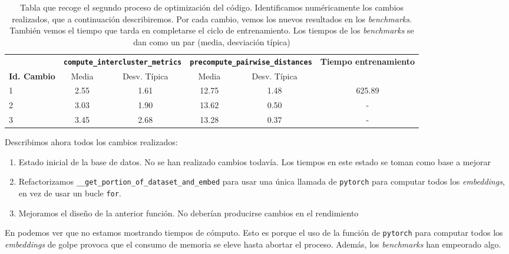 \begin{table}[H]
    \centering
    \begin{tabular}{lccccc}
        \toprule
        \textbf{} & \multicolumn{2}{c}{\textbf{\lstinline|compute_intercluster_metrics|}} & \multicolumn{2}{c}{\textbf{\lstinline|precompute_pairwise_distances|}} & \textbf{Tiempo entrenamiento} \\
        \cmidrule(lr){2-3} \cmidrule(lr){4-5}
        \textbf{Id. Cambio} & Media & Desv. Típica & Media & Desv. Típica & \\
        \midrule
            1 & 2.55  & 1.61 & 12.75 & 1.48 & 625.89  \\
            2 & 3.03  & 1.90 & 13.62 & 0.50 & -       \\
            3 & 3.45  & 2.68 & 13.28 & 0.37 & -       \\
        \bottomrule
    \end{tabular}
    \caption{Tabla que recoge el segundo proceso de optimización del código. Identificamos numéricamente los cambios realizados, que a continuación describiremos. Por cada cambio, vemos los nuevos resultados en los \textit{benchmarks}. También vemos el tiempo que tarda en completarse el ciclo de entrenamiento. Los tiempos de los \textit{benchmarks} se dan como un par (media, desviación típica)}
    \label{table:optimization_process_second}
\end{table}

Describimos ahora todos los cambios realizados:

\begin{enumerate}
    \item Estado inicial de la base de datos. No se han realizado cambios todavía. Los tiempos en este estado se toman como base a mejorar
    \item Refactorizamos \lstinline{__get_portion_of_dataset_and_embed} para usar una única llamada de \lstinline{pytorch} para computar todos los \textit{embeddings}, en vez de usar un bucle \lstinline{for}.
    \item Mejoramos el diseño de la anterior función. No deberían producirse cambios en el rendimiento
\end{enumerate}

En  podemos ver que no estamos mostrando tiempos de cómputo. Esto es porque el uso de la función de \lstinline{pytorch} para computar todos los \textit{embeddings} de golpe provoca que el consumo de memoria se eleve hasta abortar el proceso. Además, los \textit{benchmarks} han empeorado algo.


